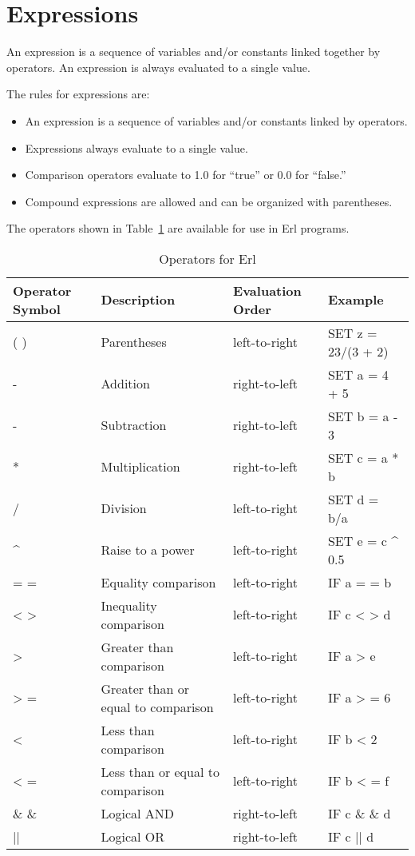\section{Expressions}\label{expressions}

An expression is a sequence of variables and/or constants linked together by operators. An expression is always evaluated to a single value.

The rules for expressions are:

\begin{itemize}
\item
  An expression is a sequence of variables and/or constants linked by operators.
\item
  Expressions always evaluate to a single value.
\item
  Comparison operators evaluate to 1.0 for ``true'' or 0.0 for ``false.''
\item
  Compound expressions are allowed and can be organized with parentheses.
\end{itemize}

The operators shown in Table~\ref{table:operators-for-erl} are available for use in Erl programs.

\begin{longtable}[c]{p{1.5in}p{1.5in}p{1.5in}p{1.5in}}
\caption{Operators for Erl \protect \label{table:operators-for-erl}}\\
\toprule 
Operator Symbol & Description & Evaluation Order & Example \tabularnewline \midrule
\endhead
( ) & Parentheses & left-to-right & SET z = 23/(3 + 2) \tabularnewline
- & Addition & right-to-left & SET a = 4 + 5 \tabularnewline
- & Subtraction & right-to-left & SET b = a - 3 \tabularnewline
* & Multiplication & right-to-left & SET c = a * b \tabularnewline
/ & Division & left-to-right & SET d = b/a \tabularnewline
\^{} & Raise to a power & left-to-right & SET e = c \^{} 0.5 \tabularnewline
= = & Equality comparison & left-to-right & IF a = = b \tabularnewline
< > ~ & Inequality comparison & left-to-right & IF c  < >  d \tabularnewline
> ~ & Greater than comparison & left-to-right & IF a  >  e \tabularnewline
>  = & Greater than or equal to comparison & left-to-right & IF a  >  = 6 \tabularnewline
< ~ & Less than comparison & left-to-right & IF b  <  2 \tabularnewline
<  = & Less than or equal to comparison & left-to-right & IF b  <  = f \tabularnewline
\& \& & Logical AND & right-to-left & IF c  \& \&  d \tabularnewline
|| & Logical OR & right-to-left & IF c || d \tabularnewline
\bottomrule
\end{longtable}

